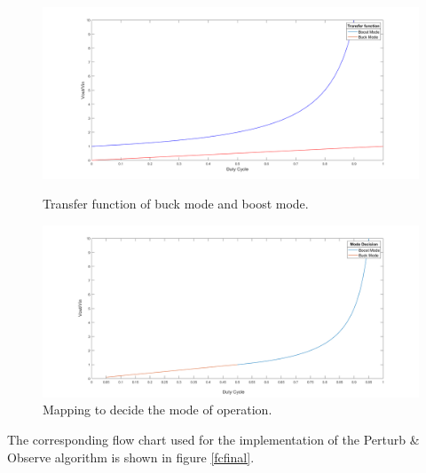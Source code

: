 \begin{figure}[H]
	\begin{minipage}[b]{0.9\linewidth}
		\centering
		\includegraphics[width=\textwidth]{../Pictures/transfer_function_buck_boost_mode}
		\caption{Transfer function of buck mode and boost mode.}
		\label{fig:tfmodes}
	\end{minipage}
	\hspace{0.5cm}
	\begin{minipage}[b]{0.9\linewidth}
		\centering
		\includegraphics[width=\textwidth]{../Pictures/Mode_decision_duty_vs_gain}
		\caption{Mapping to decide the mode of operation.}
		\label{fig:modedecisionmapping}
	\end{minipage}
\end{figure}

The corresponding flow chart used for the implementation of the Perturb \& Observe algorithm is shown in figure \ref{fcfinal}.


